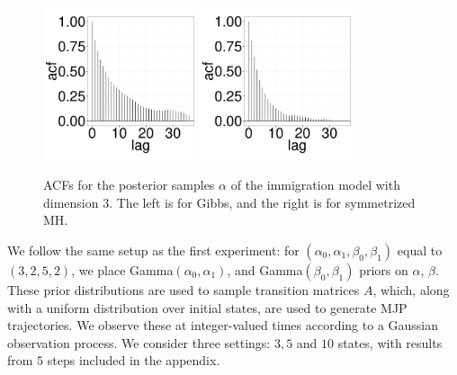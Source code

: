 {  \begin{figure}[H]
  \centering
  \begin{minipage}[!hp]{0.99\linewidth}
    \includegraphics [width=0.40\textwidth, angle=0]{figs/Q_ks/q_gbsacf_20_03_3_.pdf}
	\hspace{.5in}
    \includegraphics [width=0.40\textwidth, angle=0]{figs/Q_ks/q_mhacf_20_03_3_.pdf}
  \end{minipage}

    \caption{ACFs for the posterior samples $\alpha$ of the immigration model with dimension 3. The left is for Gibbs, and the right is for symmetrized MH.}
     \label{fig:ACF_Q}
  \end{figure}


We follow the same setup as the first experiment:
for $(\alpha_0,\alpha_1,\beta_0,\beta_1)$ equal to $(3,2,5,2)$,
we place Gamma$(\alpha_0,\alpha_1)$, and Gamma$(\beta_0, \beta_1)$ priors on 
$\alpha$, $\beta$. These prior distributions are used to sample transition 
matrices $A$, which, along with a uniform distribution over initial states,
are used to generate MJP trajectories. We observe these at integer-valued
times according to a Gaussian observation process.
We consider three settings: $3, 5$ and $10$ states, with results from $5$ 
steps included in the appendix. 

}
